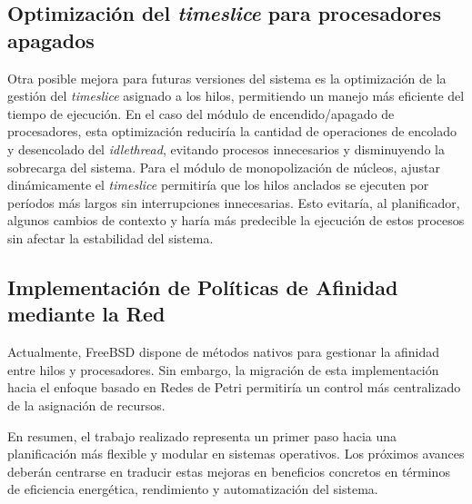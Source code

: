 \subsection{Optimización del \textit{timeslice} para procesadores apagados}
Otra posible mejora para futuras versiones del sistema es la optimización de la gestión del \textit{timeslice} asignado a los hilos, permitiendo un manejo más eficiente del tiempo de ejecución. En el caso del módulo de encendido/apagado de procesadores, esta optimización reduciría la cantidad de operaciones de encolado y desencolado del \textit{idlethread}, evitando procesos innecesarios y disminuyendo la sobrecarga del sistema. Para el módulo de monopolización de núcleos, ajustar dinámicamente el \textit{timeslice} permitiría que los hilos anclados se ejecuten por períodos más largos sin interrupciones innecesarias. Esto evitaría, al planificador, algunos cambios de contexto y haría más predecible la ejecución de estos procesos sin afectar la estabilidad del sistema.\par

\subsection{Implementación de Políticas de Afinidad mediante la Red}
Actualmente, FreeBSD dispone de métodos nativos para gestionar la afinidad entre hilos y procesadores. Sin embargo, la migración de esta implementación hacia el enfoque basado en Redes de Petri permitiría un control más centralizado de la asignación de recursos.\par

En resumen, el trabajo realizado representa un primer paso hacia una planificación más flexible y modular en sistemas operativos. Los próximos avances deberán centrarse en traducir estas mejoras en beneficios concretos en términos de eficiencia energética, rendimiento y automatización del sistema.\par
